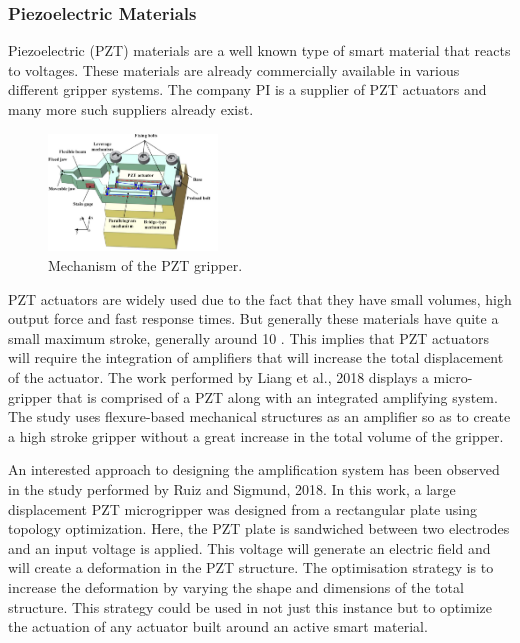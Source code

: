 \subsubsection{Piezoelectric Materials}
Piezoelectric (PZT) materials are a well known type of smart material that reacts to voltages. These materials are already commercially available in various different gripper systems. The company PI\cite{noauthor_p-604_2018} is a supplier of PZT actuators and many more such suppliers already exist.

\begin{figure}
	\centering
	\includegraphics[width=0.4\textwidth]{Figures/PZT_grip.png}
	\caption{Mechanism of the PZT gripper\cite{liang_design_2018}.}
	\label{fig:PZT_grip}
\end{figure}

PZT actuators are widely used due to the fact that they have small volumes, high output force and fast response times. But generally these materials have quite a small maximum stroke, generally around 10 \micrometer. This implies that PZT actuators will require the integration of amplifiers that will increase the total displacement of the actuator. The work performed by Liang et al., 2018\cite{liang_design_2018} displays a micro-gripper that is comprised of a PZT along with an integrated amplifying system. The study uses flexure-based mechanical structures as an amplifier so as to create a high stroke gripper without a great increase in the total volume of the gripper.

An interested approach to designing the amplification system has been observed in the study performed by Ruiz and Sigmund, 2018\cite{ruiz_optimal_2018}. In this work, a large displacement PZT microgripper was designed from a rectangular plate using topology optimization. Here, the PZT plate is sandwiched between two electrodes and an input voltage is applied. This voltage will generate an electric field and will create a deformation in the PZT structure. The optimisation strategy is to increase the deformation by varying the shape and dimensions of the total structure. This strategy could be used in not just this instance but to optimize the actuation of any actuator built around an active smart material.

